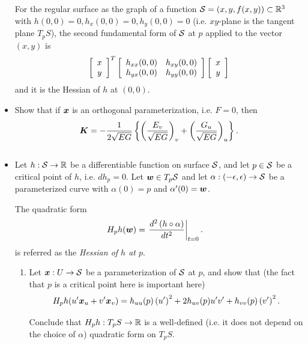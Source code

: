 \documentclass[11pt]{article}
\begin{document}
\begin{itemize}
For the regular surface as the graph of a function ${\mathcal S} = (x,y, f(x,y)) \subset {\mathbb R}^{3}$ with $h(0,0)= 0, h_{x}(0,0)=0, h_{y}(0,0) = 0$ (i.e. $xy$-plane is the tangent plane $T_{p}S$), the second fundamental form of ${\mathcal S}$ at $p$ applied to the vector $(x,y)$ is 
\begin{align*}
\left[\begin{array}{c}
x \\ 
y
\end{array} \right]^{T}\left[\begin{array}{cc}
h_{xx}(0,0) & h_{xy}(0,0) \\ 
h_{yx}(0,0) & h_{yy}(0,0)
\end{array} \right]\left[\begin{array}{c}
x \\ 
y
\end{array} \right]
\end{align*} and it is the Hessian of $h$ at $(0,0)$.\\[20pt]

\item \begin{example}
Show that if $\boldsymbol{x}$ is an orthogonal parameterization, i.e. $F=0$, then 
\begin{align*}
\boldsymbol{K} &= -\frac{1}{2\sqrt{EG}}\left\{\left(\frac{E_{v}}{\sqrt{EG}}\right)_{v} + \left(\frac{G_{u}}{\sqrt{EG}}\right)_{u} \right\}.\\[10pt]
\end{align*}
\end{example}

\newpage
\item \begin{example}
Let $h: {\mathcal S} \rightarrow {\mathbb R}$ be a differentiable function on surface ${\mathcal S}$, and let $p\in {\mathcal S}$ be a critical point of $h$, i.e. $dh_{p} = 0$. Let $\boldsymbol{w}\in T_{p}{\mathcal S}$ and let $\alpha: (-\epsilon, \epsilon) \rightarrow {\mathcal S}$ be a parameterized curve with $\alpha(0) = p$ and $\alpha'(0)= \boldsymbol{w}$. 
\begin{definition}
The quadratic form 
\begin{align*}
H_{p}h(\boldsymbol{w}) &= \left.{\frac{d^{2} \left(h\circ \alpha\right)}{dt^{2}}}\right\vert_{t=0}.
\end{align*}  is referred as the \emph{Hessian of $h$ at $p$}.
\end{definition} 
\begin{enumerate}
\item Let $\boldsymbol{x}: U\rightarrow {\mathcal S}$ be a parameterization of ${\mathcal S}$ at $p$, and show that (the fact that $p$ is a critical point here is important here)
\begin{align*}
H_{p}h(u'\boldsymbol{x}_{u}+ v'\boldsymbol{x}_{v}) &= h_{uu}(p)\left(u'\right)^{2} + 2h_{uv}(p)u'v'+ h_{vv}(p)\left(v'\right)^{2}.\\[5pt]
\end{align*} Conclude that $H_{p}h: T_{p}S \rightarrow {\mathbb R}$ is a well-defined (i.e. it does not depend on the choice of $\alpha$) quadratic form on $T_{p}S$.


\end{enumerate}
\end{example}
\end{itemize}
\end{document}
